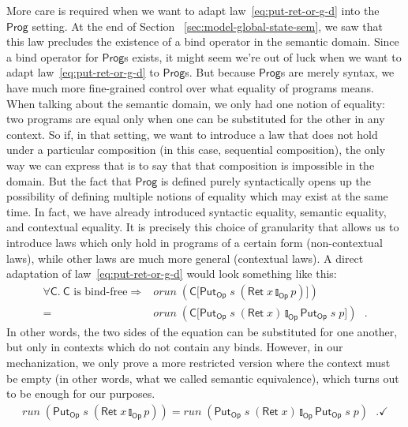 \documentclass{jfp}
\newcommand{\Conid}[1]{\mathit{#1}}
\newcommand{\Varid}[1]{\mathit{#1}}
\let\Varid\mathit
\let\Conid\mathsf
\begin{document}
More care is required when we want to adapt law~\eqref{eq:put-ret-or-g-d}
into the \ensuremath{\Conid{Prog}} setting. At the end of Section~
\ref{sec:model-global-state-sem}, we saw that this law precludes the existence
of a bind operator in the semantic domain.
Since a bind operator for \ensuremath{\Conid{Prog}}s exists, it might seem we're out of luck when
we want to adapt law~\eqref{eq:put-ret-or-g-d} to \ensuremath{\Conid{Prog}}s.
But because \ensuremath{\Conid{Prog}}s are merely syntax, we have much more fine-grained control
over what equality of programs means.
When talking about the semantic domain, we only had one notion of equality: two
programs are equal only when one can be substituted for the other in any
context. So if, in that setting, we want to introduce a law that does not hold
under a particular composition (in this case, sequential composition), the only
way we can express that is to say that that composition is impossible in the
domain.
But the fact that \ensuremath{\Conid{Prog}} is defined purely syntactically opens up the
possibility of defining multiple notions of equality which may exist at the same
time. In fact, we have already introduced syntactic equality, semantic equality, and
contextual equality. It is precisely this choice of granularity that allows us
to introduce laws which only hold in programs of a certain form (non-contextual
laws), while other laws are much more general (contextual laws). A direct
adaptation of law~\eqref{eq:put-ret-or-g-d} would look something like this:
\begin{align*}
  \forall \ensuremath{\Conid{C}}.~ \ensuremath{\Conid{C}} \text{ is bind-free} \Rightarrow &\ensuremath{\Varid{orun}\;(\Conid{C}\lbrack\Conid{Put}_\Conid{Op}\;\Varid{s}\;(\Conid{Ret}\;\Varid{x}\mathbin{\talloblong}_\Conid{Op}\Varid{p})\rbrack)} \\
  = &\ensuremath{\Varid{orun}\;(\Conid{C}\lbrack\Conid{Put}_\Conid{Op}\;\Varid{s}\;(\Conid{Ret}\;\Varid{x})\mathbin{\talloblong}_\Conid{Op}\Conid{Put}_\Conid{Op}\;\Varid{s}\;\Varid{p}\rbrack)} \mbox{~~.}
\end{align*}
In other words, the two sides of the equation can be substituted for one
another, but only in contexts which do not contain any binds.
However, in our mechanization, we only prove a more restricted version where
the context must be empty (in other words, what we called semantic equivalence),
which turns out to be enough for our purposes.
\begin{align}
  \ensuremath{\Varid{run}\;(\Conid{Put}_\Conid{Op}\;\Varid{s}\;(\Conid{Ret}\;\Varid{x}\mathbin{\talloblong}_\Conid{Op}\Varid{p}))} = \ensuremath{\Varid{run}\;(\Conid{Put}_\Conid{Op}\;\Varid{s}\;(\Conid{Ret}\;\Varid{x})\mathbin{\talloblong}_\Conid{Op}\Conid{Put}_\Conid{Op}\;\Varid{s}\;\Varid{p})} \mbox{~~.} \label{eq:put-ret-or-g} \checkmark
\end{align}
\end{document}
